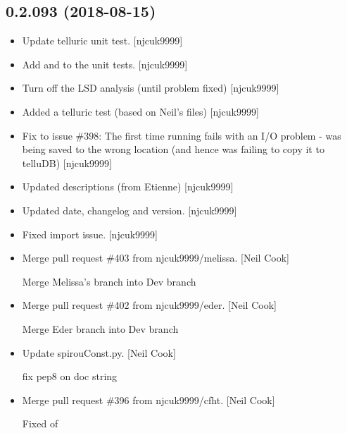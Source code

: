 \documentclass[a4paper,10pt,english]{report}
\begin{document}
\subsection{0.2.093 (2018-08-15)}
\label{\detokenize{misc/changelog:id368}}\begin{itemize}
\item {} 
Update telluric unit test. {[}njcuk9999{]}

\item {} 
Add  and  to the unit tests. {[}njcuk9999{]}

\item {} 
Turn off the LSD analysis (until problem fixed) {[}njcuk9999{]}

\item {} 
Added a telluric test (based on Neil’s files) {[}njcuk9999{]}

\item {} 
Fix to issue \#398: The first time running  fails with an
I/O problem -  was being saved to the wrong location (and
hence  was failing to copy it to telluDB) {[}njcuk9999{]}

\item {} 
Updated descriptions (from Etienne) {[}njcuk9999{]}

\item {} 
Updated date, changelog and version. {[}njcuk9999{]}

\item {} 
Fixed import issue. {[}njcuk9999{]}

\item {} 
Merge pull request \#403 from njcuk9999/melissa. {[}Neil Cook{]}

Merge Melissa’s branch into Dev branch

\item {} 
Merge pull request \#402 from njcuk9999/eder. {[}Neil Cook{]}

Merge Eder branch into Dev branch

\item {} 
Update spirouConst.py. {[}Neil Cook{]}

fix pep8 on doc string

\item {} 
Merge pull request \#396 from njcuk9999/cfht. {[}Neil Cook{]}

Fixed  of 

\end{itemize}
\end{document}
